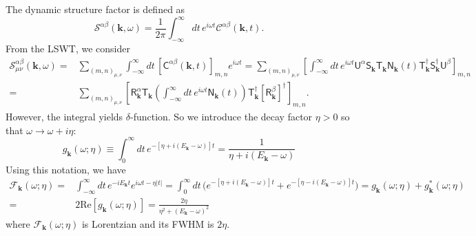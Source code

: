 \documentclass[aps, prx, nofootinbib, superscriptaddress]{revtex4-2}
\newcommand{\kvec}{\mathbf{k}}
\begin{document}
The dynamic structure factor is defined as 
\begin{equation}
    \mathcal{S}^{\alpha\beta}(\kvec, \omega) 
    = \frac{1}{2\pi} \int_{-\infty}^{\infty} d t \, e^{i \omega t} \mathcal{C}^{\alpha\beta} (\kvec, t).
\end{equation}
From the LSWT, we consider 
\begin{align*}
    \mathcal{S}^{\alpha\beta}_{\mu\nu} (\mathbf{k}, \omega) 
    = & \sum_{(m,n)_{\mu,\nu}} \int_{-\infty}^{\infty} dt \, [\mathsf{C}^{\alpha\beta} (\kvec, t)]_{m,n} e^{i \omega t}
    = \sum_{(m,n)_{\mu,\nu}} 
    \left[ 
    \int_{-\infty}^{\infty} dt \, e^{i \omega t} 
    \mathsf{U}^{\alpha} 
    \mathsf{S}_{\kvec}^{\phantom \dagger} 
    \mathsf{T}_{\kvec}^{\phantom \dagger} 
    \mathsf{N}_{\kvec}^{\phantom \dagger}  (t)
    \mathsf{T}_{\kvec}^{         \dagger}
    \mathsf{S}_{\kvec}^{         \dagger}
    \mathsf{U}^{\beta}
    \right]_{m,n}  \\
    = & \sum_{(m,n)_{\mu,\nu}} 
    \left[  \mathsf{R}^{\alpha}_{\kvec} \mathsf{T}_{\kvec}
    \left( \int_{-\infty}^{\infty} dt \, e^{i \omega t} \mathsf{N}_{\kvec} (t) \right)
    \mathsf{T}_{\kvec}^{\dagger} [\mathsf{R}^{\beta}_{\kvec}]^{\dagger} \right]_{m,n}.
\end{align*}
However, the integral yields $\delta$-function. So we introduce the decay factor $\eta > 0$ so that $\omega \rightarrow \omega + i \eta$:
\begin{equation}
    g_{\kvec} ( \omega ; \eta ) 
    \equiv \int_{0}^{\infty} dt \, e^{ - [ \eta  + i( E_{\kvec} - \omega ) ] t} 
    = \frac{1}{\eta + i ( E_{\kvec} - \omega )}
\end{equation}
Using this notation, we have
\begin{align}
    \mathcal{F}_{\kvec} (\omega; \eta) = & \int_{-\infty}^{\infty} dt\, e^{-i E_{\kvec} t} e^{ i\omega t - \eta |t|} 
    =  \int_{0}^{\infty} dt \, 
    \big( e^{ - [ \eta  + i( E_{\kvec} - \omega ) ] t} + e^{ - [ \eta  - i( E_{\kvec} - \omega ) ] t} \big) 
    =  g_{\kvec} ( \omega ; \eta ) + g_{\kvec}^{*} ( \omega ; \eta ) \\
    = & 2 \mathrm{Re} [ g_{\kvec} ( \omega ; \eta ) ]
    = \frac{2\eta}{\eta^{2} + ( E_{\kvec} - \omega )^{2}}
\end{align}
where $\mathcal{F}_{\kvec}(\omega; \eta)$ is Lorentzian and its FWHM is $2\eta$.
\end{document}
